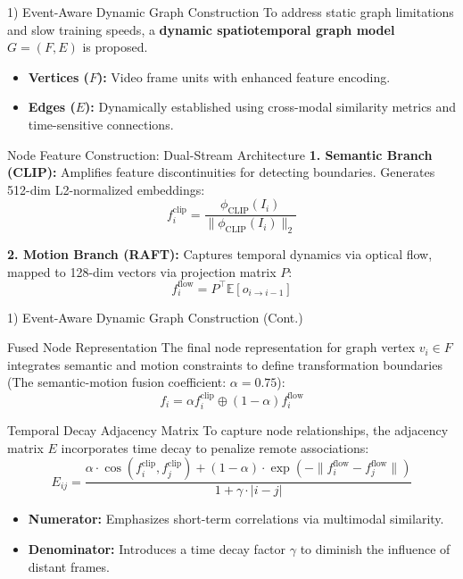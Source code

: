 \documentclass[aspectratio=169,xcolor=dvipsnames]{beamer}
\begin{document}
	
	\begin{frame}{1) Event-Aware Dynamic Graph Construction}
		\small
		To address static graph limitations and slow training speeds, a \textbf{dynamic spatiotemporal graph model} $G = (F, E)$ is proposed.
		\begin{itemize}
			\item \textbf{Vertices ($F$):} Video frame units with enhanced feature encoding.
			\item \textbf{Edges ($E$):} Dynamically established using cross-modal similarity metrics and time-sensitive connections.
		\end{itemize}
		
		\begin{block}{Node Feature Construction: Dual-Stream Architecture}
			\textbf{1. Semantic Branch (CLIP):} Amplifies feature discontinuities for detecting boundaries. Generates 512-dim L2-normalized embeddings:
			$$ f_{i}^{\text{clip}} = \frac{\phi_{\text{CLIP}}(I_i)}{\|\phi_{\text{CLIP}}(I_i)\|_2} $$
			
			\textbf{2. Motion Branch (RAFT):} Captures temporal dynamics via optical flow, mapped to 128-dim vectors via projection matrix $P$:
			$$ f_{i}^{\text{flow}} = P^\top \mathbb{E}[o_{i\to i-1}] $$
		\end{block}
	\end{frame}
	
	
	
	\begin{frame}{1) Event-Aware Dynamic Graph Construction (Cont.)}
		\small
		
		\begin{block}{Fused Node Representation}
			The final node representation for graph vertex $v_i \in F$ integrates semantic and motion constraints to define transformation boundaries (The semantic-motion fusion coefficient: \textbf{$\alpha = 0.75$}):
			$$ f_i = \alpha f_{i}^{\text{clip}} \oplus (1 - \alpha) f_{i}^{\text{flow}} $$
		\end{block}
		
		\begin{alertblock}{Temporal Decay Adjacency Matrix}
			To capture node relationships, the adjacency matrix $E$ incorporates time decay to penalize remote associations:
			$$ E_{ij} = \frac{\alpha \cdot \cos(f_{i}^{\text{clip}}, f_{j}^{\text{clip}}) + (1 - \alpha) \cdot \exp(-\| f_{i}^{\text{flow}} - f_{j}^{\text{flow}} \|)}{1 + \gamma \cdot |i - j|} $$
			\begin{itemize}
				\item \textbf{Numerator:} Emphasizes short-term correlations via multimodal similarity.
				\item \textbf{Denominator:} Introduces a time decay factor \textbf{$\gamma$} to diminish the influence of distant frames.
			\end{itemize}
		\end{alertblock}
	\end{frame}
	
\end{document}
